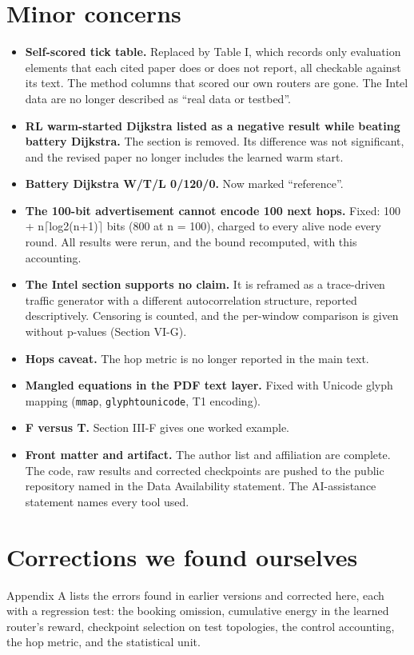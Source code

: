 \documentclass[11pt]{article}
\begin{document}
\section*{Minor concerns}
\begin{itemize}[leftmargin=*,itemsep=2pt]
\item \textbf{Self-scored tick table.} Replaced by Table I, which records only evaluation elements that each cited paper does or does not report, all checkable against its text. The method columns that scored our own routers are gone. The Intel data are no longer described as ``real data or testbed''.
\item \textbf{RL warm-started Dijkstra listed as a negative result while beating battery Dijkstra.} The section is removed. Its difference was not significant, and the revised paper no longer includes the learned warm start.
\item \textbf{Battery Dijkstra W/T/L 0/120/0.} Now marked ``reference''.
\item \textbf{The 100-bit advertisement cannot encode 100 next hops.} Fixed: 100 + n$\lceil$log2(n+1)$\rceil$ bits (800 at n = 100), charged to every alive node every round. All results were rerun, and the bound recomputed, with this accounting.
\item \textbf{The Intel section supports no claim.} It is reframed as a trace-driven traffic generator with a different autocorrelation structure, reported descriptively. Censoring is counted, and the per-window comparison is given without p-values (Section VI-G).
\item \textbf{Hops caveat.} The hop metric is no longer reported in the main text.
\item \textbf{Mangled equations in the PDF text layer.} Fixed with Unicode glyph mapping (\texttt{mmap}, \texttt{glyphtounicode}, T1 encoding).
\item \textbf{F versus T.} Section III-F gives one worked example.
\item \textbf{Front matter and artifact.} The author list and affiliation are complete. The code, raw results and corrected checkpoints are pushed to the public repository named in the Data Availability statement. The AI-assistance statement names every tool used.
\end{itemize}

\section*{Corrections we found ourselves}
Appendix A lists the errors found in earlier versions and corrected here, each with a regression test: the booking omission, cumulative energy in the learned router's reward, checkpoint selection on test topologies, the control accounting, the hop metric, and the statistical unit.
\end{document}
